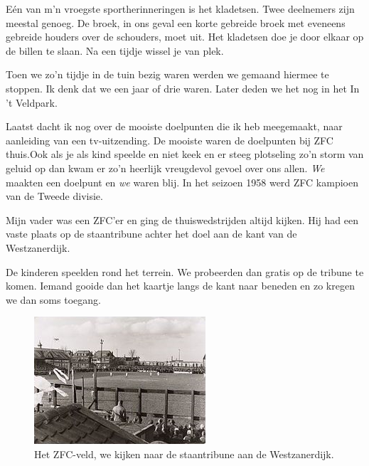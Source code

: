 \documentclass[12pt,twoside]{memoir}
\begin{document}
Eén van m’n vroegste sportherinneringen is het kladetsen. Twee deelnemers zijn meestal genoeg. De broek, in ons geval een korte gebreide broek met eveneens gebreide houders over de schouders, moet uit. Het kladetsen doe je door elkaar op de billen te slaan. Na een tijdje wissel je van plek. 

Toen we zo’n tijdje in de tuin bezig waren werden we gemaand hiermee te stoppen. Ik denk dat we een jaar of drie waren. Later deden we het nog in het In ’t Veldpark.

Laatst dacht ik nog over de mooiste doelpunten die ik heb meegemaakt, naar aanleiding van een tv-uitzending. De mooiste waren de doelpunten bij ZFC thuis.Ook als je als kind speelde en niet keek en er steeg plotseling zo’n storm van geluid op dan kwam er zo’n heerlijk vreugdevol gevoel over ons allen. \emph{We} maakten een doelpunt en \emph{we} waren blij. In het seizoen 1958 werd ZFC kampioen van de Tweede divisie.

Mijn vader was een ZFC’er en ging de thuiswedstrijden altijd kijken. Hij had een vaste plaats op de staantribune achter het doel aan de kant van de Westzanerdijk. 

De kinderen speelden rond het terrein. We probeerden dan gratis op de tribune te komen. Iemand gooide dan het kaartje langs de kant naar beneden en zo kregen we dan soms toegang. 

\begin{figure}
\includegraphics[width=\textwidth]{img/ch11/image}
\caption*{\footnotesize Het ZFC-veld, we kijken naar de staantribune aan de Westzanerdijk.}
\end{figure}
\end{document}
